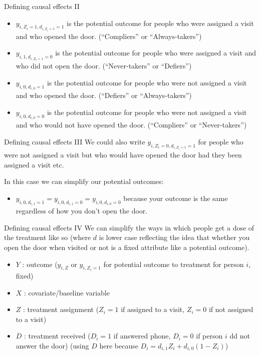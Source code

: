 \documentclass[
  ignorenonframetext,
]{beamer}
\providecommand{\tightlist}{%
  \setlength{\itemsep}{0pt}\setlength{\parskip}{0pt}}
\begin{document}
\begin{frame}{Defining causal effects II}
\protect\hypertarget{defining-causal-effects-ii}{}
\begin{itemize}
\item
  \(y_{i,Z_i = 1, d_{i,Z_i=1}=1}\) is the potential outcome for people
  who were assigned a visit and who opened the door. (``Compliers'' or
  ``Always-takers'')
\item
  \(y_{i,1, d_{i,Z_i=1}=0}\) is the potential outcome for people who
  were assigned a visit and who did not open the door. (``Never-takers''
  or ``Defiers'')
\item
  \(y_{i,0, d_{i,0}=1}\) is the potential outcome for people who were
  not assigned a visit and who opened the door. (``Defiers'' or
  ``Always-takers'')
\item
  \(y_{i,0, d_{i,0}=0}\) is the potential outcome for people who were
  not assigned a visit and who would not have opened the door.
  (``Compliers'' or ``Never-takers'')
\end{itemize}
\end{frame}

\begin{frame}{Defining causal effects III}
\protect\hypertarget{defining-causal-effects-iii}{}
We could also write \(y_{i,Z_i = 0, d_{i,Z_i=1}=1}\) for people who were
not assigned a visit but who would have opened the door had they been
assigned a visit etc.

In this case we can simplify our potential outcomes:

\begin{itemize}
\tightlist
\item
  \(y_{i,0, d_{i,1}=1} = y_{i,0, d_{i,1}=0} = y_{i,0, d_{i,0}=0}\)
  because your outcome is the same regardless of how you don't open the
  door.
\end{itemize}
\end{frame}

\begin{frame}{Defining causal effects IV}
\protect\hypertarget{defining-causal-effects-iv}{}
We can simplify the ways in which people get a dose of the treatment
like so (where \(d\) is lower case reflecting the idea that whether you
open the door when visited or not is a fixed attribute like a potential
outcome).

\begin{itemize}
\tightlist
\item
  \(Y\) : outcome (\(y_{i,Z}\) or \(y_{i,Z_i=1}\) for potential outcome
  to treatment for person \(i\), fixed)
\item
  \(X\) : covariate/baseline variable
\item
  \(Z\) : treatment assignment (\(Z_i=1\) if assigned to a visit,
  \(Z_i=0\) if not assigned to a visit)
\item
  \(D\) : treatment received (\(D_i=1\) if answered phone, \(D_i=0\) if
  person \(i\) dd not answer the door) (using \(D\) here because
  \(D_i = d_{i,1} Z_{i} + d_{i,0} (1-Z_i)\))
\end{itemize}
\end{frame}
\end{document}
